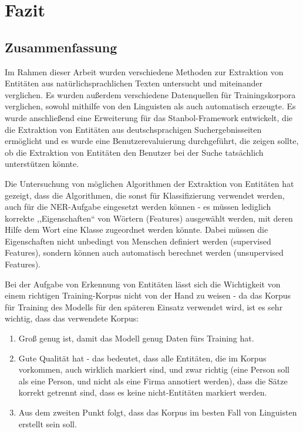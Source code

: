 \chapter{Fazit}

\section{Zusammenfassung}
Im Rahmen dieser Arbeit wurden verschiedene Methoden zur Extraktion von Entitäten aus natürlichsprachlichen Texten untersucht und miteinander verglichen. Es wurden außerdem verschiedene Datenquellen für Trainingskorpora verglichen, sowohl mithilfe von den Linguisten als auch automatisch erzeugte. Es wurde anschließend eine Erweiterung für das Stanbol-Framework entwickelt, die die Extraktion von Entitäten aus deutschsprachigen Suchergebnisseiten ermöglicht und es wurde eine Benutzerevaluierung durchgeführt, die zeigen sollte, ob die Extraktion von Entitäten den Benutzer bei der Suche tatsächlich unterstützen könnte. 

Die Untersuchung von möglichen Algorithmen der Extraktion von Entitäten hat gezeigt, dass die Algorithmen, die sonst für Klassifizierung verwendet werden, auch für die NER-Aufgabe eingesetzt werden können - es müssen lediglich korrekte ,,Eigenschaften`` von Wörtern (Features) ausgewählt werden, mit deren Hilfe dem Wort eine Klasse zugeordnet werden könnte. Dabei müssen die Eigenschaften nicht unbedingt von Menschen definiert werden (supervised Features), sondern können auch automatisch berechnet werden (unsupervised Features).

Bei der Aufgabe von Erkennung von Entitäten lässt sich die Wichtigkeit von einem richtigen Training-Korpus nicht von der Hand zu weisen - da das Korpus für Training des Modells für den späteren Einsatz verwendet wird, ist es sehr wichtig, dass das verwendete Korpus:
\begin{enumerate}
\item Groß genug ist, damit das Modell genug Daten fürs Training hat.
\item Gute Qualität hat - das bedeutet, dass alle Entitäten, die im Korpus vorkommen, auch wirklich markiert sind, und zwar richtig (eine Person soll als eine Person, und nicht als eine Firma annotiert werden), dass die Sätze korrekt getrennt sind, dass es keine nicht-Entitäten markiert werden.
\item Aus dem zweiten Punkt folgt, dass das Korpus im besten Fall von Linguisten erstellt sein soll.
\end{enumerate}

